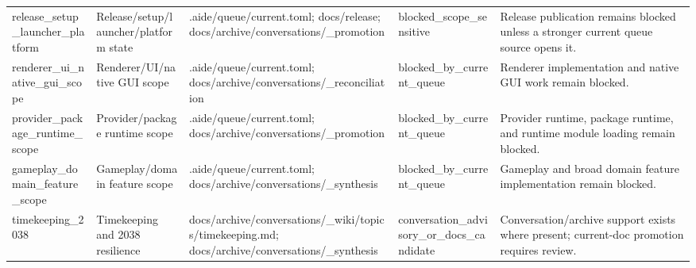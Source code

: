 \documentclass[10.5pt,a4paper,openany]{book}
\begin{document}
\begin{center}
{\begin{tabularx}{\linewidth}{@{}>{\raggedright\arraybackslash}X >{\raggedright\arraybackslash}X >{\raggedright\arraybackslash}X >{\raggedright\arraybackslash}X >{\raggedright\arraybackslash}X@{}}
release\_\allowbreak{}setup\_\allowbreak{}launcher\_\allowbreak{}platform & Release/\allowbreak{}setup/\allowbreak{}launcher/\allowbreak{}platform state & .\allowbreak{}aide/\allowbreak{}queue/\allowbreak{}current.\allowbreak{}toml; docs/\allowbreak{}release; docs/\allowbreak{}archive/\allowbreak{}conversations/\allowbreak{}\_\allowbreak{}promotion & blocked\_\allowbreak{}scope\_\allowbreak{}sensitive & Release publication remains blocked unless a stronger current queue source opens it.\allowbreak{} \\
renderer\_\allowbreak{}ui\_\allowbreak{}native\_\allowbreak{}gui\_\allowbreak{}scope & Renderer/\allowbreak{}UI/\allowbreak{}native GUI scope & .\allowbreak{}aide/\allowbreak{}queue/\allowbreak{}current.\allowbreak{}toml; docs/\allowbreak{}archive/\allowbreak{}conversations/\allowbreak{}\_\allowbreak{}reconciliation & blocked\_\allowbreak{}by\_\allowbreak{}current\_\allowbreak{}queue & Renderer implementation and native GUI work remain blocked.\allowbreak{} \\
provider\_\allowbreak{}package\_\allowbreak{}runtime\_\allowbreak{}scope & Provider/\allowbreak{}package runtime scope & .\allowbreak{}aide/\allowbreak{}queue/\allowbreak{}current.\allowbreak{}toml; docs/\allowbreak{}archive/\allowbreak{}conversations/\allowbreak{}\_\allowbreak{}promotion & blocked\_\allowbreak{}by\_\allowbreak{}current\_\allowbreak{}queue & Provider runtime, package runtime, and runtime module loading remain blocked.\allowbreak{} \\
gameplay\_\allowbreak{}domain\_\allowbreak{}feature\_\allowbreak{}scope & Gameplay/\allowbreak{}domain feature scope & .\allowbreak{}aide/\allowbreak{}queue/\allowbreak{}current.\allowbreak{}toml; docs/\allowbreak{}archive/\allowbreak{}conversations/\allowbreak{}\_\allowbreak{}synthesis & blocked\_\allowbreak{}by\_\allowbreak{}current\_\allowbreak{}queue & Gameplay and broad domain feature implementation remain blocked.\allowbreak{} \\
timekeeping\_\allowbreak{}2038 & Timekeeping and 2038 resilience & docs/\allowbreak{}archive/\allowbreak{}conversations/\allowbreak{}\_\allowbreak{}wiki/\allowbreak{}topics/\allowbreak{}timekeeping.\allowbreak{}md; docs/\allowbreak{}archive/\allowbreak{}conversations/\allowbreak{}\_\allowbreak{}synthesis & conversation\_\allowbreak{}advisory\_\allowbreak{}or\_\allowbreak{}docs\_\allowbreak{}candidate & Conversation/\allowbreak{}archive support exists where present; current-\allowbreak{}doc promotion requires review.\allowbreak{} \\

\end{tabularx}}
\end{center}
\end{document}
